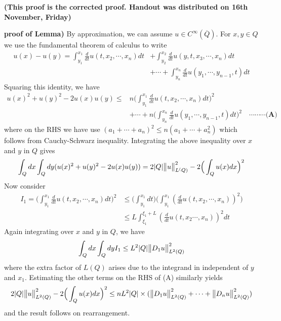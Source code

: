 \documentclass[12pt,a4paper]{report}
\newenvironment{proof}
{\begin{changemargin}{1cm}{0.5cm} 
	}%
	{\end{changemargin}
}
\begin{document}
\begin{proof}
\textbf{(This proof is the corrected proof. Handout was distributed on 16th November, Friday)}
\s

\textbf{proof of Lemma)} By approximation, we can assume $u\in C^{\infty}(\overline{Q})$. For $x,y\in Q$ we use the fundamental theorem of calculus to write
\begin{align*}
u(x)-u(y) = \int_{y_1}^{x_1} \frac{d}{dt} u(t,x_2, \cdots, x_n) dt &+ \int_{y_2}^{x_2} \frac{d}{dt} u(y,t,x_3, \cdots, x_n) dt \\
& + \cdots + \int_{y_n}^{x_n} \frac{d}{dt} u(y_1, \cdots, y_{n-1},t)dt
\end{align*}
Squaring this identity, we have
\begin{align*}
u(x)^2 + u(y)^2 - 2u(x)u(y) \leq & n \Big( \int_{y_1}^{x_1} \frac{d}{dt} u(t,x_2, \cdots, x_n)dt \Big)^2 \\
& + \cdots + n\Big( \int_{y_n}^{x_n} \frac{d}{dt} u(y_1, \cdots, y_{n-1},t)dt \Big)^2 \quad \cdots \cdots \cdots \textbf{(A)}
\end{align*}
where on the RHS we have use $(a_1 + \cdots + a_n)^2 \leq n(a_1 + \cdots + a_n^2)$ which follows from Cauchy-Schwarz inequality. Integrating the above inequality over $x$ and $y$ in $Q$ gives
\begin{align*}
\int_Q dx \int_Q dy (u(x)^2 + u(y)^2 -2u(x)u(y)) = 2|Q|\bigl\lVert u\bigr\rVert_{L^(Q)}^2 -2 \Big( \int_Q u(x) dx \Big)^2
\end{align*}
Now consider
\begin{align*}
I_1 = \Big( \int_{y_1}^{x_1} \frac{d}{dt} u(t,x_2, \cdots, x_n) dt\Big)^2 &\leq \Big( \int_{y_1}^{x_1} dt\Big) \Big( \int_{y_1}^{x_1} (\frac{d}{dt}u(t,x_2, \cdots, x_n))^2 \Big) \\
&\leq L \int_{\xi_1}^{\xi_1 +L} (\frac{d}{dt} u(t,x_2\cdots,x_n))^2 dt
\end{align*}
Again integrating over $x$ and $y$ in $Q$, we have
\begin{align*}
\int_Q dx \int_Q dy I_1 \leq L^2 |Q| \bigl\lVert D_1 u\bigr\rVert_{L^2(Q)}^2
\end{align*}
where the extra factor of $L(Q)$ arises due to the integrand in independent of $y$ and $x_1$. Estimating the other terms on the RHS of (A) similarly yields
\begin{align*}
2 |Q| \bigl\lVert u\bigr\rVert_{L^2(Q)}^2 - 2 \Big( \int_Q u(x) dx\Big)^2 \leq nL^2 |Q| \times (\bigl\lVert D_1 u\bigr\rVert_{L^2(Q)}^2 + \cdots + \bigl\lVert D_n u\bigr\rVert_{L^2(Q)}^2)
\end{align*}
and the result follows on rearrangement.

\eop
\end{proof}
\end{document}
